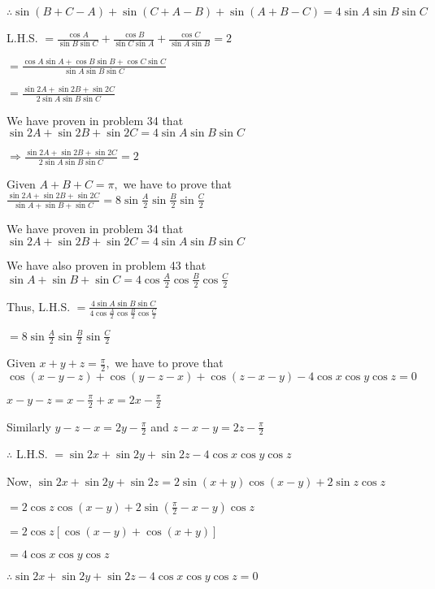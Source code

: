   $\therefore \sin(B + C - A) + \sin(C + A - B) + \sin(A + B - C) = 4\sin A\sin B\sin C$

\item L.H.S. $= \frac{\cos A}{\sin B\sin C} + \frac{\cos B}{\sin C\sin A} + \frac{\cos C}{\sin A\sin B} = 2$

  $= \frac{\cos A\sin A + \cos B\sin B + \cos C\sin C}{\sin A\sin B\sin C}$

  $= \frac{\sin 2A + \sin 2B + \sin 2C}{2\sin A\sin B\sin C}$

  We have proven in problem 34 that $\sin 2A + \sin 2B + \sin 2C = 4\sin A\sin B\sin C$

  $\Rightarrow \frac{\sin 2A + \sin 2B + \sin 2C}{2\sin A\sin B\sin C} = 2$

\item Given $A + B + C = \pi,$ we have to prove that $\frac{\sin 2A + \sin 2B + \sin 2C}{\sin A + \sin B + \sin C} =
  8\sin \frac{A}{2}\sin \frac{B}{2}\sin \frac{C}{2}$

  We have proven in problem 34 that $\sin 2A + \sin 2B + \sin 2C = 4\sin A\sin B\sin C$

  We have also proven in problem 43 that $\sin A + \sin B + \sin C = 4\cos \frac{A}{2}\cos \frac{B}{2}\cos\frac{C}{2}$

  Thus, L.H.S. $= \frac{4\sin A\sin B\sin C}{4\cos \frac{A}{2}\cos \frac{B}{2}\cos\frac{C}{2}}$

  $= 8\sin \frac{A}{2}\sin \frac{B}{2}\sin \frac{C}{2}$

\item Given $x + y + z = \frac{\pi}{2},$ we have to prove that $\cos(x - y - z) + \cos(y - z - x) + \cos(z - x - y) -
  4\cos x\cos y\cos z = 0$

  $x - y - z = x - \frac{\pi}{2} + x = 2x - \frac{\pi}{2}$

  Similarly $y - z - x = 2y - \frac{\pi}{2}$ and $z - x - y = 2z - \frac{\pi}{2}$

  $\therefore$ L.H.S. $= \sin 2x + \sin 2y + \sin 2z - 4\cos x\cos y \cos z$

  Now, $\sin 2x + \sin 2y + \sin 2z = 2\sin(x + y)\cos(x - y) + 2\sin z\cos z$

  $= 2\cos z\cos(x - y) + 2\sin\left(\frac{\pi}{2} - x - y\right)\cos z$

  $= 2\cos z[\cos(x - y) + \cos(x + y)]$

  $= 4\cos x\cos y\cos z$

  $\therefore \sin 2x + \sin 2y + \sin 2z - 4\cos x\cos y \cos z = 0$

